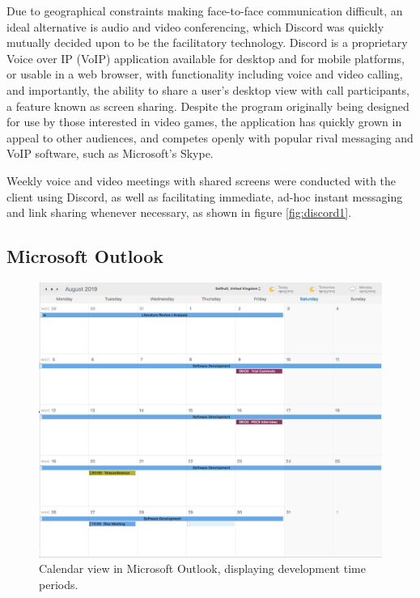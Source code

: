 Due to geographical constraints making face-to-face communication difficult, an ideal alternative is audio and video conferencing, which Discord was quickly mutually decided upon to be the facilitatory technology. Discord is a proprietary Voice over IP (VoIP) application available for desktop and for mobile platforms, or usable in a web browser, with functionality including voice and video calling, and importantly, the ability to share a user's desktop view with call participants, a feature known as screen sharing. \cite{Melcon1} Despite the program originally being designed for use by those interested in video games, the application has quickly grown in appeal to other audiences, and competes openly with popular rival messaging and VoIP software, such as Microsoft's Skype. \cite{Giret1}

Weekly voice and video meetings with shared screens were conducted with the client using Discord, as well as facilitating immediate, ad-hoc instant messaging and link sharing whenever necessary, as shown in figure \ref{fig:discord1}.

\subsection{Microsoft Outlook}
\begin{figure}[!ht]
    \includegraphics[width=\textwidth]{Figures/outlook}
    \caption{Calendar view in Microsoft Outlook, displaying development time periods.}
    \label{fig:outlook1}
\end{figure}

